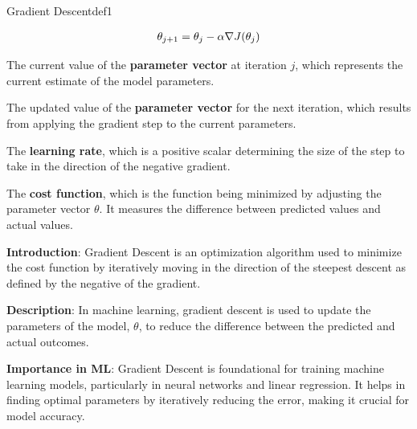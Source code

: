 \documentclass[
  12 pt,
  a4paper,
]{book}
\numberwithin{equation}{section}
\theoremstyle{plain}      %
\theoremstyle{definition} %
\theoremstyle{remark}     %
\theoremstyle{note}         %
\begin{document}
\begin{a_def_eq}{Gradient Descent}{def1} 

\begin{align}
\large{\theta_{j+1} = \theta_j - \alpha \nabla J(\theta_j)}
\end{align}

\begin{description}[align=left, labelwidth=2cm, labelsep=0em, leftmargin=2cm]
    \item[$\theta_j$] The current value of the \textbf{parameter vector} at iteration $j$, which represents the current estimate of the model parameters.
    \vspace{0.5\baselineskip}
    \item[$\theta_{j+1}$] The updated value of the \textbf{parameter vector} for the next iteration, which results from applying the gradient step to the current parameters.
    \vspace{0.5\baselineskip}
    \item[$\alpha$] The \textbf{learning rate}, which is a positive scalar determining the size of the step to take in the direction of the negative gradient.
    \vspace{0.5\baselineskip}
    \item[$J$] The \textbf{cost function}, which is the function being minimized by adjusting the parameter vector $\theta$. It measures the difference between predicted values and actual values.
\end{description}

\end{a_def_eq}

\hfill\break

\textbf{Introduction}: Gradient Descent is an optimization algorithm
used to minimize the cost function by iteratively moving in the
direction of the steepest descent as defined by the negative of the
gradient.

\textbf{Description}: In machine learning, gradient descent is used to
update the parameters of the model, \(\theta\), to reduce the difference
between the predicted and actual outcomes.

\textbf{Importance in ML}: Gradient Descent is foundational for training
machine learning models, particularly in neural networks and linear
regression. It helps in finding optimal parameters by iteratively
reducing the error, making it crucial for model accuracy.\\

\vspace*{\fill}
\end{document}
